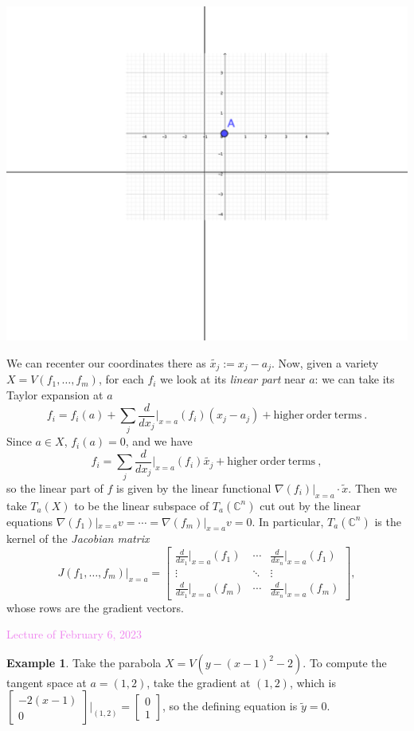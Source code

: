 \documentclass{amsart}[12pt]
\newcommand{\Feb}[1]{\textcolor{violet}{Lecture of February #1, 2023}}
\newcommand{\C}{\mathbb{C}}
\numberwithin{equation}{section}
\theoremstyle{plain} %
\theoremstyle{definition}
\newtheorem{ex}[equation]{Example}
\theoremstyle{remark}
\begin{document}
\begin{center}
\includegraphics[scale=.4]{tang1}
\end{center}

We can recenter our coordinates there as $\widetilde{x_j}:=x_j-a_j$. Now, given a variety $X=V(f_1,\dots,f_m)$, for each $f_i$ we look at its \emph{linear part} near $a$: we can take its Taylor expansion at $a$
\[ f_i = f_i(a) + \sum_j \frac{d}{dx_j}|_{x=a}(f_i) (x_j-a_j) + \mathrm{higher \ order \ terms} \ . \]
Since $a\in X$, $f_i(a)=0$, and we have
\[ f_i = \sum_j \frac{d}{dx_j}|_{x=a}(f_i) \widetilde{x_j} + \mathrm{higher\  order\  terms} \ ,\]
so the linear part of $f$ is given by the linear functional $\nabla(f_i)|_{x=a}\cdot \widetilde{x}$. Then we take $T_{a}(X)$ to be the linear subspace of $T_a(\C^n)$ cut out by the linear equations $\nabla(f_1)|_{x=a} v= \cdots = \nabla(f_m)|_{x=a} v = 0$. In particular, $T_a(\C^n)$ is the kernel of the \emph{Jacobian matrix}
\[ J(f_1,\dots,f_m)|_{x=a} = \begin{bmatrix} \frac{d}{dx_1}|_{x=a} (f_1)& \cdots & \frac{d}{dx_n}|_{x=a} (f_1) \\ 
\vdots & \ddots & \vdots \\
\frac{d}{dx_1}|_{x=a} (f_m)& \cdots & \frac{d}{dx_n}|_{x=a} (f_m) \end{bmatrix},\]
whose rows are the gradient vectors.

\Feb{6}
\begin{ex}
Take the parabola $X=V(y - (x-1)^2 -2)$. To compute the tangent space at $a=(1,2)$, take the gradient at $(1,2)$, which is $\begin{bmatrix} -2(x-1) \\ 0\end{bmatrix} |_{(1,2)} =\begin{bmatrix} 0 \\ 1 \end{bmatrix}$, so the defining equation is $\widetilde{y}=0$.
\end{ex}
\end{document}
